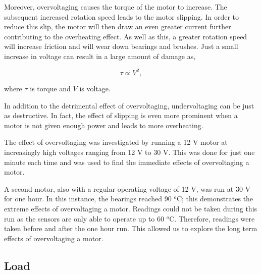 Moreover, overvoltaging causes the torque of the motor to increase. The subsequent increased rotation speed leads to the motor %
slipping. In order to reduce this slip, the motor will then draw an even greater current further contributing to the overheating effect. As well as this, a greater rotation speed will increase friction and will wear down bearings and brushes. Just a small increase in voltage can result in a large amount of damage as,

\begin{equation}
\tau \propto V^2,
\label{Torque}
\end{equation}

where $\tau$ is torque and $V$ is voltage.

In addition to the detrimental effect of overvoltaging, undervoltaging can be just as destructive. In fact, the effect of slipping is even more prominent when a motor is not given enough power and leads to more overheating.


The effect of overvoltaging  was investigated by running a 12 V motor at increasingly high voltages ranging from 12 V to 30 V. This was done for just one minute each time and was used to find the immediate effects of overvoltaging a motor.
    

A second motor, also with a regular operating voltage of 12 V, was run at 30 V for one hour. In this instance, the bearings reached 90 $^o$C; this demonstrates the extreme effects of overvoltaging a motor. Readings could not be taken during this run as the sensors are only able to operate %
up to 60 $^o$C. %
Therefore, readings were taken before and after the one hour run. This allowed us to explore the long term effects of overvoltaging a motor.




\subsection{Load}



    
